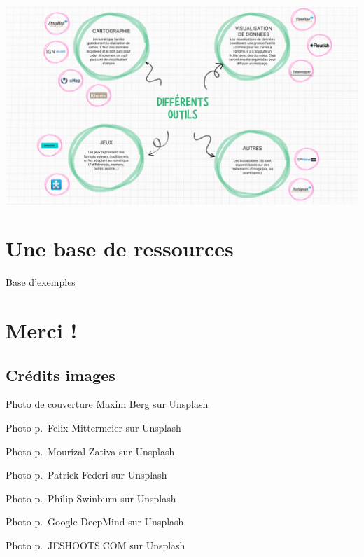 \documentclass[
  letterpaper,
  DIV=11,
  numbers=noendperiod]{scrartcl}
\begin{document}
\begin{center}
\includegraphics{img/outils.png}
\end{center}

\section{Une base de ressources}\label{une-base-de-ressources}

\href{https://aldonzel.github.io/archives-mediation/}{Base d'exemples}

\section{Merci !}\label{merci}

\subsection{Crédits images}\label{cruxe9dits-images}

Photo de couverture Maxim Berg sur Unsplash

Photo p.~Felix Mittermeier sur Unsplash

Photo p.~Mourizal Zativa sur Unsplash

Photo p.~Patrick Federi sur Unsplash

Photo p.~Philip Swinburn sur Unsplash

Photo p.~Google DeepMind sur Unsplash

Photo p.~JESHOOTS.COM sur Unsplash
\end{document}
